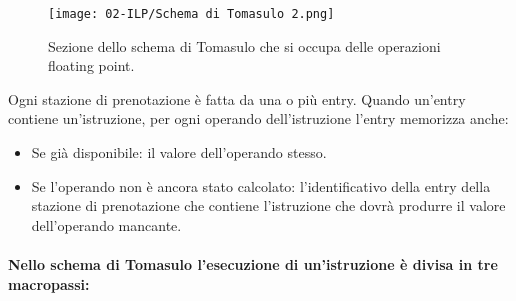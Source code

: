 \begin{figure}[!h]
    \centering
    \texttt{[image: 02-ILP/Schema di Tomasulo 2.png]}
    \caption{Sezione dello schema di Tomasulo che si occupa delle operazioni floating point.}
\end{figure}

Ogni stazione di prenotazione è fatta da una o più entry. Quando un'entry contiene un'istruzione,
per ogni operando dell'istruzione l'entry memorizza anche: 

\begin{itemize}
  \item Se già disponibile: il valore dell'operando stesso. 
  \item Se l'operando non è ancora stato calcolato: l'identificativo della entry della stazione di prenotazione che contiene l'istruzione che dovrà produrre il valore dell'operando mancante.
\end{itemize}


\paragraph{Nello schema di Tomasulo l'esecuzione di un'istruzione è divisa in tre macropassi:} 

